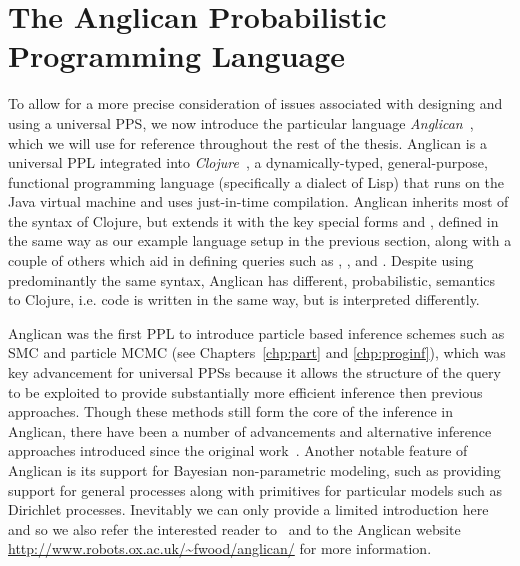 
\section{The Anglican Probabilistic Programming Language}
\label{sec:probprog:anglican}

To allow for a more precise consideration of issues associated with designing and using a universal
PPS, we now introduce the particular language \emph{Anglican}~\citep{wood2014new,tolpin2016design},
which we will use for reference throughout the rest of the thesis.  
Anglican is a universal PPL integrated into \emph{Clojure}~\citep{hickey2008clojure}, a dynamically-typed, general-purpose, functional
programming language (specifically a dialect of Lisp) that runs on the Java virtual machine and uses just-in-time compilation.
Anglican inherits most of the syntax of Clojure, but extends it with the key
special forms \sample and \observe \citep{tolpin2015probabilistic,tolpin2016design}, defined in the same way as
our example language setup in the previous section, along with a couple of others which aid in defining queries
such as \mem, \store, and \retrieve.  Despite using predominantly the same syntax, Anglican has different, 
probabilistic, semantics to Clojure, i.e. code is written in the same way, but is interpreted differently.

Anglican was the first PPL to introduce particle based 
inference schemes such as SMC and particle MCMC (see Chapters~\ref{chp:part} and \ref{chp:proginf}), which was
key advancement for universal PPSs because it allows the structure of the query to be exploited to provide
substantially more efficient inference then previous approaches.  Though these methods still form the core
of the inference in Anglican, there have been a number of advancements and alternative inference approaches introduced since
the original work~\citep{paige2014asynchronous,tolpin-socs-2015,tolpin2015output,vandemeent_aistats_2015,
	rainforth2016interacting,rainforth2016bayesian,le2017inference}.  Another notable feature of Anglican is its
support for Bayesian non-parametric modeling, such as providing support for general processes along with
primitives for particular models such as Dirichlet processes.  Inevitably we can only provide a limited 
introduction here and so we also refer the interested reader to~\cite{tolpin2016design} and to the Anglican website {\small\url{http://www.robots.ox.ac.uk/~fwood/anglican/}} for more information.

